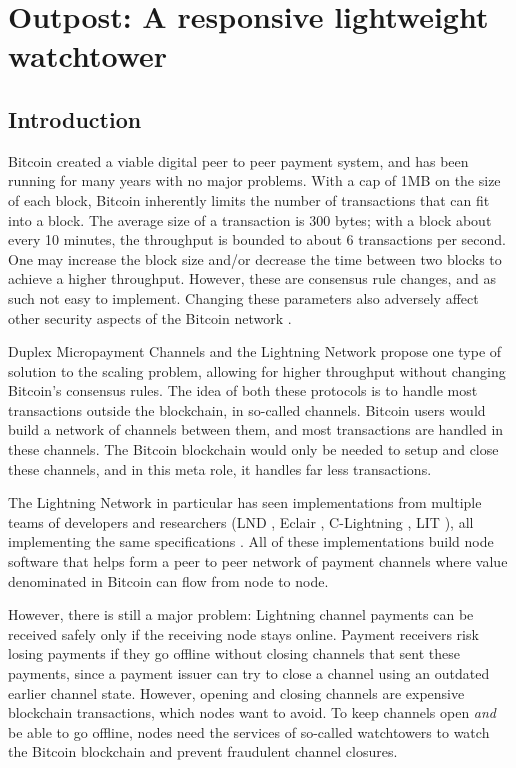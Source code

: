 \chapter{Outpost: A responsive lightweight watchtower}  %
\label{chapter:outpost}

\section{Introduction}
Bitcoin \cite{bitcoin_whitepaper} created a viable digital peer to peer payment system, and has been running for many years with no major problems. With a cap of 1MB on the size of each block, Bitcoin inherently limits the number of transactions that can fit into a block. The average size of a transaction is 300 bytes; with a block about every 10 minutes, the throughput is bounded to about 6 transactions per second. One may increase the block size and/or decrease the time between two blocks to achieve a higher throughput. However, these are consensus rule changes, and as such not easy to implement. Changing these parameters also adversely affect other security aspects of the Bitcoin network \cite{gervais2016security}.

Duplex Micropayment Channels \cite{decker_wattenhofer} and the Lightning Network \cite{poon_dryja} propose one type of solution to the scaling problem, allowing for higher throughput without changing Bitcoin's consensus rules. The idea of both these protocols is to handle most transactions outside the blockchain, in so-called channels. Bitcoin users would build a network of channels between them, and most transactions are handled in these channels. The Bitcoin blockchain would only be needed to setup and close these channels, and in this meta role, it handles far less transactions. 

The Lightning Network in particular has seen implementations from multiple teams of developers and researchers (LND \cite{lnd}, Eclair \cite{eclair}, C-Lightning \cite{c_lightning}, LIT \cite{lit}), all implementing the same specifications \cite{bolt}. All of these implementations build node software that helps form a peer to peer network of payment channels where value denominated in Bitcoin can flow from node to node. 

However, there is still a major problem: Lightning channel payments can be received safely only if the receiving node stays online. Payment receivers risk losing payments if they go offline without closing channels that sent these payments, since a payment issuer can try to close a channel using an outdated earlier channel state. However, opening and closing channels are expensive blockchain transactions, which nodes want to avoid. To keep channels open \textit{and} be able to go offline, nodes need the services of so-called watchtowers \cite{watchtowers} to watch the Bitcoin blockchain and prevent fraudulent channel closures.


